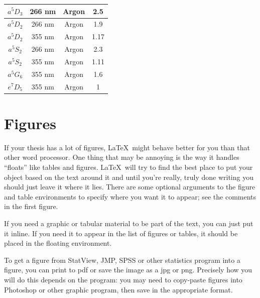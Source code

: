 \documentclass[12pt,twoside]{reedthesis}
\begin{document}
\begin{longtable}{||c|c|c|c||}
	$a^{5}D_{3}$         & 266 nm           & Argon      & 2.5                                                       \\\hline
	$a^{5}D_{2}$         & 266 nm           & Argon      & 1.9                                                       \\\hline
	$a^{5}D_{2}$         & 355 nm           & Argon      & 1.17                                                      \\\hline
	$a^{5}S_{2}$         & 266 nm           & Argon      & 2.3                                                       \\\hline
	$a^{5}S_{2}$         & 355 nm           & Argon      & 1.11                                                      \\\hline
	$a^{5}G_{6}$         & 355 nm           & Argon      & 1.6                                                       \\\hline
	$e^{7}D_{5}$         & 355 nm           & Argon      & 1                                                         \\\hline
\end{longtable}


\section{Figures}

If your thesis has a lot of figures, \LaTeX\ might behave better for you than that other word processor.  One thing that may be annoying is the way it handles ``floats'' like tables and figures. \LaTeX\ will try to find the best place to put your object based on the text around it and until you're really, truly done writing you should just leave it where it lies.   There are some optional arguments to the figure and table environments to specify where you want it to appear; see the comments in the first figure.

If you need a graphic or tabular material to be part of the text, you can just put it inline. If you need it to appear in the list of figures or tables, it should be placed in the floating environment.

To get a figure from StatView, JMP, SPSS or other statistics program into a figure, you can print to pdf or save the image as a jpg or png. Precisely how you will do this depends on the program: you may need to copy-paste figures into Photoshop or other graphic program, then save in the appropriate format.
\end{document}
